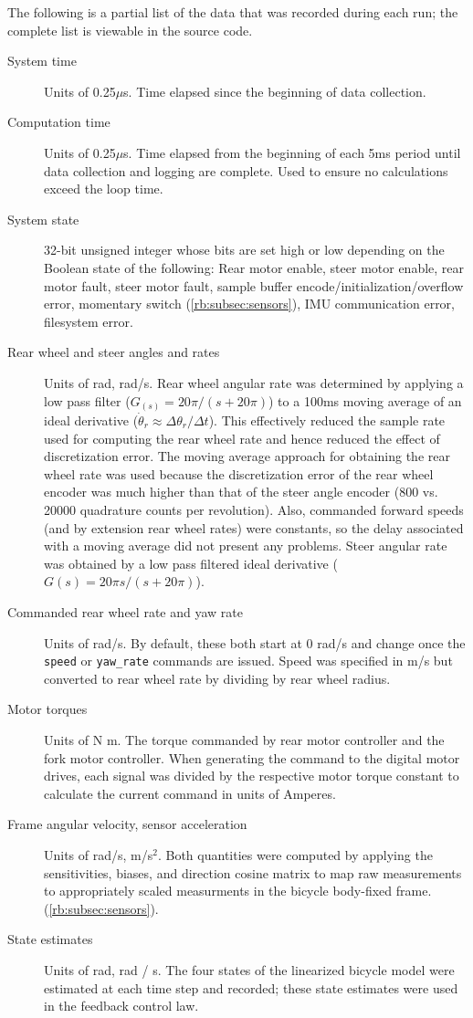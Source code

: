 The following is a partial list of the data that was recorded during each run;
the complete list is viewable in the source code.
\begin{description}
  \item[System time] Units of 0.25$\mu$s. Time elapsed since the beginning of
    data collection.
  \item[Computation time] Units of 0.25$\mu$s. Time elapsed from the
    beginning of each 5ms period until data collection and logging are
    complete. Used to ensure no calculations exceed the loop time.
  \item[System state] 32-bit unsigned integer whose bits are set high or low
    depending on the Boolean state of the following: Rear motor enable, steer
    motor enable, rear motor fault, steer motor fault, sample buffer
    encode/initialization/overflow error, momentary switch
    (\autoref{rb:subsec:sensors}), IMU communication error, filesystem error.
  \item[Rear wheel and steer angles and rates] Units of rad, rad/s. Rear wheel
    angular rate was determined by applying a low pass filter ($G_(s) = 20 \pi
    / (s + 20 \pi)$) to a 100ms moving average of an ideal derivative
    ($\dot{\theta}_r \approx \Delta\theta_r / \Delta t$). This effectively
    reduced the sample rate used for computing the rear wheel rate and hence
    reduced the effect of discretization error.  The moving average approach
    for obtaining the rear wheel rate was used because the discretization error
    of the rear wheel encoder was much higher than that of the steer angle
    encoder (800 vs. 20000 quadrature counts per revolution).  Also, commanded
    forward speeds (and by extension rear wheel rates) were constants, so the
    delay associated with a moving average did not present any problems.  Steer
    angular rate was obtained by a low pass filtered ideal derivative
    ($G(s)=20\pi s/(s+20\pi)$).
  \item[Commanded rear wheel rate and yaw rate] Units of rad/s. By
    default, these both start at 0 rad/s and change once the \verb|speed| or
    \verb|yaw_rate| commands are issued. Speed was specified in m/s but
    converted to rear wheel rate by dividing by rear wheel radius.
  \item[Motor torques] Units of N m. The torque commanded by rear motor
    controller and the fork motor controller. When generating the command to
    the digital motor drives, each signal was divided by the respective motor
    torque constant to calculate the current command in units of Amperes.
  \item[Frame angular velocity, sensor acceleration] Units of rad/s, m/s$^2$.
    Both quantities were computed by applying the sensitivities, biases, and
    direction cosine matrix to map raw measurements to appropriately scaled
    measurments in the bicycle body-fixed frame.
    (\autoref{rb:subsec:sensors}).
  \item[State estimates] Units of rad, rad / s. The four states of the
    linearized bicycle model were estimated at each time step and recorded;
    these state estimates were used in the feedback control law.
\end{description}

